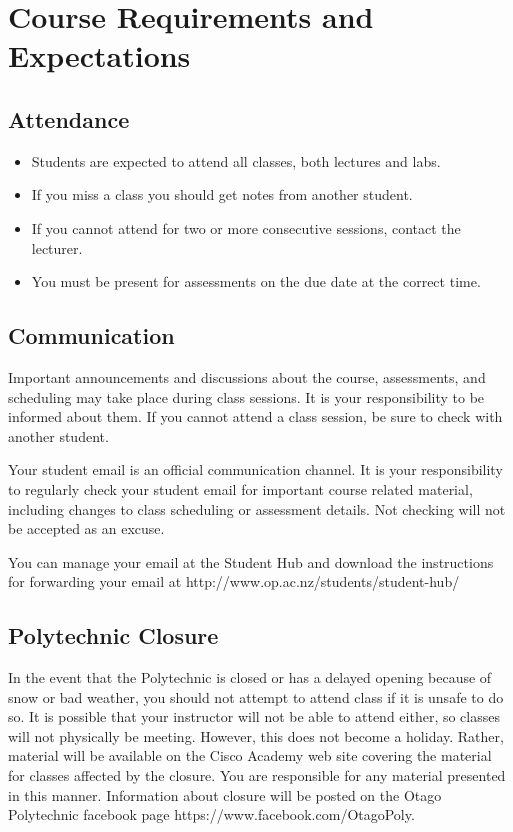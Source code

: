 \documentclass{article}
\begin{document}
\section*{Course Requirements and Expectations}
\subsection*{Attendance}
\begin{itemize}
 \item Students are expected to attend all classes, both lectures and labs.
 \item If you miss a class you should get notes from another student.
 \item If you cannot attend for two or more consecutive sessions, contact the lecturer.
 \item You must be present for assessments on the due date at the correct time.
\end{itemize}

\subsection*{Communication}
Important announcements and discussions about the course, assessments, and scheduling may take place during class sessions.  It is your responsibility to be informed about them.  If you cannot attend a class session, be sure to check with another student.

Your student email is an official communication channel. It is your responsibility to regularly check your student email for important course related material, including changes to class scheduling or assessment details. Not checking will not be accepted as an excuse.

You can manage your email at the Student Hub and download the instructions for forwarding your email at http://www.op.ac.nz/students/student-hub/

\subsection*{Polytechnic Closure}
In the event that the Polytechnic is closed or has a delayed opening because of snow or bad weather, you should not attempt to attend class if it is unsafe to do so. It is possible that your instructor will not be able to attend either, so classes will not physically be meeting. However, this does not become a holiday. Rather, material will be available on the Cisco Academy web site covering the material for classes affected by the closure. You are responsible for any material presented in this manner. Information about closure will be posted on the Otago Polytechnic facebook page https://www.facebook.com/OtagoPoly.
\end{document}
